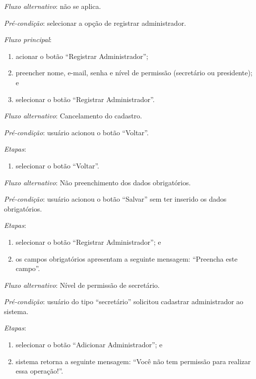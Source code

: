 \noindent \textit{Fluxo alternativo}: não se aplica.


\vspace{0.7cm}

\noindent \textit{Pré-condição}: selecionar a opção de registrar administrador.

\noindent \textit{Fluxo principal}:

\begin{enumerate}
    \item acionar o botão ``Registrar Administrador'';
    \item preencher nome, e-mail, senha e nível de permissão (secretário ou presidente); e
    \item selecionar o botão ``Registrar Administrador''.
\end{enumerate}

\noindent \textit{Fluxo alternativo}: Cancelamento do cadastro.

\noindent \textit{Pré-condição}: usuário acionou o botão ``Voltar''.

\noindent \textit{Etapas}:

\begin{enumerate}
    \item selecionar o botão ``Voltar''.
\end{enumerate}

\noindent \textit{Fluxo alternativo}: Não preenchimento dos dados obrigatórios.

\noindent \textit{Pré-condição}: usuário acionou o botão ``Salvar'' sem ter inserido os dados obrigatórios.

\noindent \textit{Etapas}:

\begin{enumerate}
    \item selecionar o botão ``Registrar Administrador''; e
    \item os campos obrigatórios apresentam a seguinte mensagem: ``Preencha este campo''.
\end{enumerate}


\noindent \textit{Fluxo alternativo}: Nível de permissão de secretário.

\noindent \textit{Pré-condição}: usuário do tipo ``secretário'' solicitou cadastrar administrador ao sistema.

\noindent \textit{Etapas}:

\begin{enumerate}
    \item selecionar o botão ``Adicionar Administrador''; e
    \item sistema retorna a seguinte mensagem: ``Você não tem permissão para realizar essa operação!''.
\end{enumerate}


